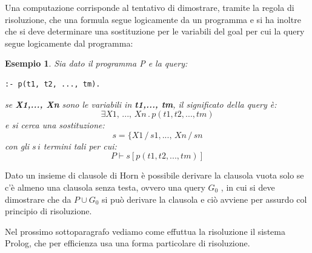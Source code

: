 \documentclass[a4paper]{report}
\newtheorem{esempio}{Esempio}
\begin{document}
Una computazione corrisponde al tentativo di dimostrare, tramite la regola di risoluzione, che una formula segue logicamente da un programma
e si ha inoltre che si deve determinare una sostituzione per le variabili del goal per cui la query segue  logicamente dal programma:
\begin{esempio}
Sia dato il programma P e la query:
\begin{verbatim}
:- p(t1, t2, ..., tm).
\end{verbatim}
se \textbf{X1,..., Xn} sono le variabili in \textbf{t1,..., tm}, il significato della query è:
$$\exists X1,\,..., \,Xn\, . \,p(t1, t2, ..., tm)$$
e si cerca una sostituzione:
$$s=\{X1\,/\,s1,...,\, Xn\,/\,sn$$
con gli $s\,i$ termini tali per cui:
$$P\vdash s[p(t1, t2, ..., tm)]$$
\end{esempio}
Dato un insieme di clausole di Horn è possibile derivare la clausola vuota solo se c'è almeno una clausola senza testa, ovvero una query $G_0$
, in cui si deve dimostrare che da $P \cup G_0$ si può derivare la clausola e ciò avviene per assurdo col principio di risoluzione.

Nel prossimo sottoparagrafo vediamo come effuttua la risoluzione il sistema Prolog, che per efficienza usa una forma particolare di risoluzione.
\end{document}
